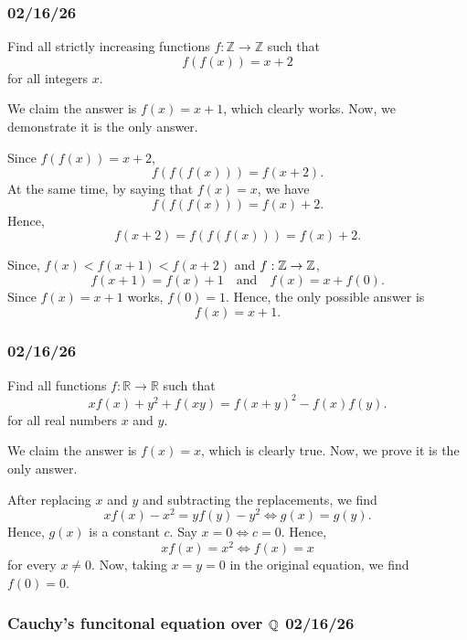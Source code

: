 \clearpage

\subsubsection{02/16/26}
\begin{problem}
Find all strictly increasing functions $f:\mathbb{Z}\to\mathbb{Z}$ such that
\[
	f(f(x))=x+2
\]
for all integers $x$.
\end{problem}
We claim the answer is $f(x)=x+1$, which clearly works. Now, we demonstrate it is the only answer.

Since $f(f(x))=x+2$,
\[
	f(f(f(x)))=f(x+2).
\]
At the same time, by saying that $f(x)=x$, we have
\[
	f(f(f(x)))=f(x)+2.
\]
Hence,
\[
	f(x+2)=f(f(f(x)))=f(x)+2.
\]

Since, $f(x)<f(x+1)<f(x+2)$ and $f: \mathbb{Z} \to \mathbb{Z}$,
\[
	f(x+1)=f(x)+1 \quad \text{and} \quad f(x)=x+f(0).
\]
Since $f(x)=x+1$ works, $f(0)=1$. Hence, the only possible answer is
\[
	f(x)=x+1.
\]

\clearpage

\subsubsection{02/16/26}
\begin{problem}
Find all functions $f:\mathbb{R}\to\mathbb{R}$ such that
\[
	x f(x) + y^{2} + f(xy) = f(x+y)^{2} - f(x)f(y).
\]
for all real numbers $x$ and $y$.
\end{problem}

We claim the answer is $f(x)=x$, which is clearly true. Now, we prove it is the only answer.

After replacing $x$ and $y$ and subtracting the replacements, we find
\[
	xf(x)-x^2=yf(y)-y^2 \iff g(x)=g(y).
\]
Hence, $g(x)$ is a constant $c$. Say $x=0 \iff c=0$. Hence,
\[
	xf(x)=x^2 \iff f(x)=x
\]
for every $x \neq 0$. Now, taking $x=y=0$ in the original equation, we find $f(0)=0$.

\clearpage

\subsubsection{Cauchy's funcitonal equation over $\mathbb{Q}$ 02/16/26}
\begin{problem}
\end{problem}
